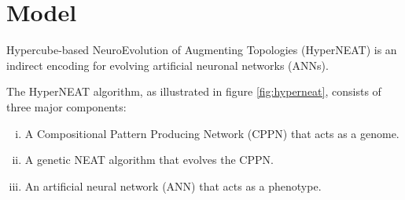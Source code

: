 \graphicspath{{figures/}}


\chapter{Model}\label{chap:model}

Hypercube-based NeuroEvolution of Augmenting Topologies (HyperNEAT) is an indirect encoding for evolving artificial neuronal networks (ANNs).

The HyperNEAT algorithm, as illustrated in figure \ref{fig:hyperneat}, consists of three major components:
\begin{enumerate}[(i)]
    \item A Compositional Pattern Producing Network (CPPN) that acts as a genome.
    \item A genetic NEAT algorithm that evolves the CPPN.
    \item An artificial neural network (ANN) that acts as a phenotype.
\end{enumerate}

